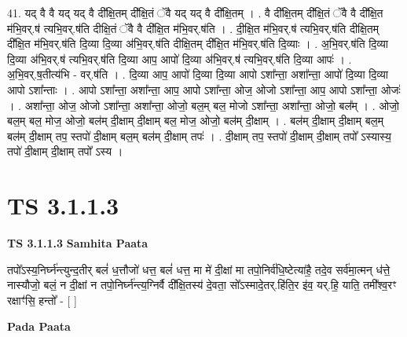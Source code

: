 \documentclass[17pt]{extarticle}
\begin{document}
41. यद् वै वै यद् यद् वै दी᳚क्षि॒तम् दी᳚क्षि॒तं ॅवै यद् यद् वै दी᳚क्षि॒तम् । . वै दी᳚क्षि॒तम् दी᳚क्षि॒तं ॅवै वै दी᳚क्षि॒त म॑भि॒वर्.ष॑ त्यभि॒वर्.ष॑ति दीक्षि॒तं ॅवै वै दी᳚क्षि॒त म॑भि॒वर्.ष॑ति । . दी॒क्षि॒त म॑भि॒वर्.ष॑ त्यभि॒वर्.ष॑ति दीक्षि॒तम् दी᳚क्षि॒त म॑भि॒वर्.ष॑ति दि॒व्या दि॒व्या अ॑भि॒वर्.ष॑ति दीक्षि॒तम् दी᳚क्षि॒त म॑भि॒वर्.ष॑ति दि॒व्याः । . अ॒भि॒वर्.ष॑ति दि॒व्या दि॒व्या अ॑भि॒वर्.ष॑ त्यभि॒वर्.ष॑ति दि॒व्या आप॒ आपो॑ दि॒व्या अ॑भि॒वर्.ष॑ त्यभि॒वर्.ष॑ति दि॒व्या आपः॑ । . अ॒भि॒वर्.ष॒तीत्य॑भि - वर्.ष॑ति । . दि॒व्या आप॒ आपो॑ दि॒व्या दि॒व्या आपो ऽशा᳚न्ता॒ अशा᳚न्ता॒ आपो॑ दि॒व्या दि॒व्या आपो ऽशा᳚न्ताः । . आपो ऽशा᳚न्ता॒ अशा᳚न्ता॒ आप॒ आपो ऽशा᳚न्ता॒ ओज॒ ओजो ऽशा᳚न्ता॒ आप॒ आपो ऽशा᳚न्ता॒ ओजः॑ । . अशा᳚न्ता॒ ओज॒ ओजो ऽशा᳚न्ता॒ अशा᳚न्ता॒ ओजो॒ बल॒म् बल॒ मोजो ऽशा᳚न्ता॒ अशा᳚न्ता॒ ओजो॒ बल᳚म् । . ओजो॒ बल॒म् बल॒ मोज॒ ओजो॒ बल॑म् दी॒क्षाम् दी॒क्षाम् बल॒ मोज॒ ओजो॒ बल॑म् दी॒क्षाम् । . बल॑म् दी॒क्षाम् दी॒क्षाम् बल॒म् बल॑म् दी॒क्षाम् तप॒ स्तपो॑ दी॒क्षाम् बल॒म् बल॑म् दी॒क्षाम् तपः॑ । . दी॒क्षाम् तप॒ स्तपो॑ दी॒क्षाम् दी॒क्षाम् तपो᳚ ऽस्यास्य॒ तपो॑ दी॒क्षाम् दी॒क्षाम् तपो᳚ ऽस्य । \newline
\pagebreak
{}

\section{ TS 3.1.1.3 }

\textbf{TS 3.1.1.3 } \newline
\textbf{Samhita Paata} \newline

तपो᳚ऽस्य॒निर्घ्न॑न्त्युन्द॒तीर् बलं॑ ध॒त्तौजो॑ धत्त॒ बलं॑ धत्त॒ मा मे॑ दी॒क्षां मा तपो॒निर्व॑धि॒ष्टेत्या॑है॒ तदे॒व सर्व॑मा॒त्मन् ध॑त्ते॒ नास्यौजो॒ बलं॒ न दी॒क्षां न तपो॒निर्घ्न॑न्त्य॒ग्निर्वै दी᳚क्षि॒तस्य॑ दे॒वता॒ सो᳚ऽस्मादे॒तर्.हि॑ति॒र इ॑व॒ यर्.हि॒ याति॒ तमी᳚श्व॒रꣳ रक्षाꣳ॑सि॒ हन्तो᳚ -  [  ] \newline

\textbf{Pada Paata} \newline
\end{document}

